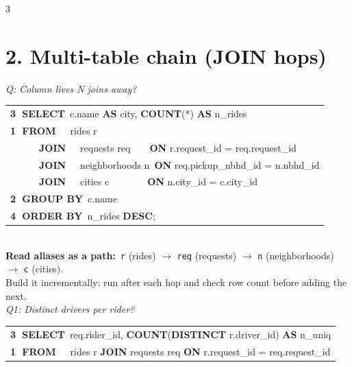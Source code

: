 \documentclass[landscape,letterpaper,9pt]{extarticle}
\begin{document}
\begin{multicols*}{3}
\section*{2. Multi-table chain (JOIN hops)}
\textit{\scriptsize Q: Column lives N joins away?}\\[1pt]
\colorbox{black!4}{%
\begin{minipage}{\dimexpr\linewidth-2pt}
{\ttfamily\scriptsize
\begin{tabular}{@{}l@{}}
\textcolor{stepGroup}{\textbf{\textcircled{\scriptsize 3} SELECT}~c.name \textbf{AS} city, \textbf{COUNT}(*) \textbf{AS} n\_rides} \\
\textcolor{stepFrom}{\textbf{\textcircled{\scriptsize 1} FROM}~~~rides r} \\
\textcolor{stepFrom}{~~~~~~\textbf{JOIN}~~~requests req~~~~\textbf{ON} r.request\_id = req.request\_id} \\
\textcolor{stepFrom}{~~~~~~\textbf{JOIN}~~~neighborhoods n~\textbf{ON} req.pickup\_nbhd\_id = n.nbhd\_id} \\
\textcolor{stepFrom}{~~~~~~\textbf{JOIN}~~~cities c~~~~~~~~\textbf{ON} n.city\_id = c.city\_id} \\
\textcolor{stepWhere}{\textbf{\textcircled{\scriptsize 2} GROUP BY}~c.name} \\
\textcolor{stepHaving}{\textbf{\textcircled{\scriptsize 4} ORDER BY}~n\_rides \textbf{DESC};} \\
\end{tabular}}
\end{minipage}}
\\[2pt]
\textbf{\scriptsize Read aliases as a path:}~{\scriptsize \texttt{r} (rides) $\to$ \texttt{req} (requests) $\to$ \texttt{n} (neighborhoods) $\to$ \texttt{c} (cities).}\\[1pt]
\textcolor{cmt}{\scriptsize Build it incrementally: run after each hop and check row count before adding the next.}\\[3pt]
\textit{\scriptsize Q1: Distinct drivers per rider?}\\[1pt]
\colorbox{black!4}{%
\begin{minipage}{\dimexpr\linewidth-2pt}
{\ttfamily\scriptsize
\begin{tabular}{@{}l@{}}
\textcolor{stepGroup}{\textbf{\textcircled{\scriptsize 3} SELECT}~req.rider\_id, \textbf{COUNT}(\textbf{DISTINCT} r.driver\_id) \textbf{AS} n\_uniq} \\
\textcolor{stepFrom}{\textbf{\textcircled{\scriptsize 1} FROM}~~~rides r \textbf{JOIN} requests req \textbf{ON} r.request\_id = req.request\_id} \\

\end{tabular}}
\end{minipage}}
\end{multicols*}
\end{document}
